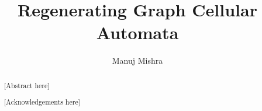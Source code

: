 \documentclass[a4paper, twoside]{report}
\title{Regenerating Graph Cellular Automata}
\author{Manuj Mishra}
\begin{document}


\begin{abstract}
[Abstract here]
\end{abstract}

\renewcommand{\abstractname}{Acknowledgements}
\begin{abstract}
[Acknowledgements here]
\end{abstract}

\tableofcontents
\listoffigures
\listoftables
\listofalgorithms






% 




\end{document}
